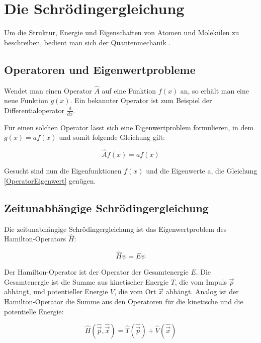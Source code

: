\section{Die Schrödingergleichung}

Um die Struktur, Energie und Eigenschaften von Atomen und Molekülen zu beschreiben, bedient man sich der Quantenmechanik \cite{Reinhold}.

\subsection{Operatoren und Eigenwertprobleme}

Wendet man einen Operator $\hat{A}$ auf eine Funktion $f(x)$ an, so erhält man eine neue Funktion $g(x)$. Ein bekannter Operator ist zum Beispiel der Differentialoperator  $\frac{d}{dx}$.

Für einen solchen Operator lässt sich eine Eigenwertproblem formulieren, in dem $g(x)= af(x)$ und somit folgende Gleichung gilt:

\begin{equation}
\hat{A}f(x)=af(x)
 \label{OperatorEigenwert}
\end{equation}

Gesucht sind nun die Eigenfunktionen $f(x)$ und die Eigenwerte a, die Gleichung \ref{OperatorEigenwert} genügen.

\subsection{Zeitunabhängige Schrödingergleichung}

Die zeitunabhängige Schrödingergleichung ist das Eigenwertproblem des Hamilton-Operators $\hat{H}$:

\begin{equation}
\hat{H} \psi = E \psi
\end{equation}

Der Hamilton-Operator ist der Operator der Gesamtenergie $E$. Die Gesamtenergie ist die Summe aus kinetischer Energie $T$, die vom Impuls $\vec{p}$ abhängt, und potentieller Energie $V$, die vom Ort $\vec{x}$ abhängt. Analog ist der Hamilton-Operator die Summe aus den Operatoren für die kinetische und die potentielle Energie:

\begin{equation}
\hat{H}(\hat{\vec{p}}, \hat{\vec{x}}) = \hat{T} (\hat{\vec{p}}) + \hat{V} (\hat{\vec{x}})
\label{HamiltonOperatorTV}
\end{equation}

